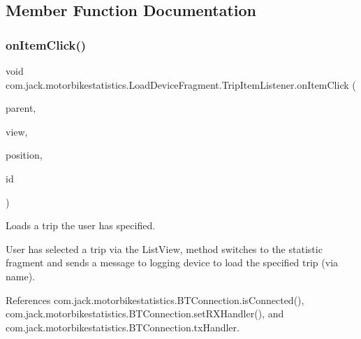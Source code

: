 \subsection{Member Function Documentation}
\mbox{\label{classcom_1_1jack_1_1motorbikestatistics_1_1_load_device_fragment_1_1_trip_item_listener_a35dc92993831e354573218d4300a2f2a}} 
\subsubsection{\texorpdfstring{on\+Item\+Click()}{onItemClick()}}
{\footnotesize\ttfamily void com.\+jack.\+motorbikestatistics.\+Load\+Device\+Fragment.\+Trip\+Item\+Listener.\+on\+Item\+Click (\begin{DoxyParamCaption}\item[{Adapter\+View$<$?$>$}]{parent,  }\item[{View}]{view,  }\item[{int}]{position,  }\item[{long}]{id }\end{DoxyParamCaption})\hspace{0.3cm}{\ttfamily [inline]}}



Loads a trip the user has specified. 

User has selected a trip via the List\+View, method switches to the statistic fragment and sends a message to logging device to load the specified trip (via name). 

References com.\+jack.\+motorbikestatistics.\+B\+T\+Connection.\+is\+Connected(), com.\+jack.\+motorbikestatistics.\+B\+T\+Connection.\+set\+R\+X\+Handler(), and com.\+jack.\+motorbikestatistics.\+B\+T\+Connection.\+tx\+Handler.


